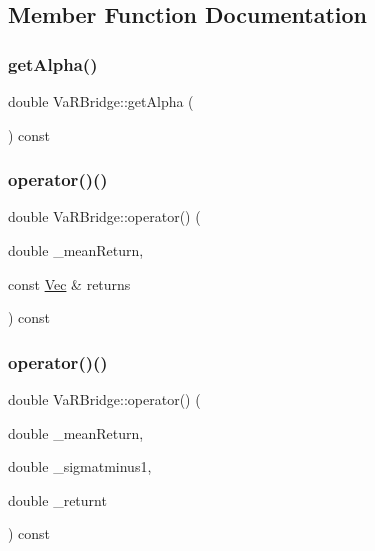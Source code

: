 \subsection{Member Function Documentation}
\hypertarget{classVaRBridge_ab7bea293648bfa62762a3c61f162107e}{}\label{classVaRBridge_ab7bea293648bfa62762a3c61f162107e} 
\subsubsection{\texorpdfstring{get\+Alpha()}{getAlpha()}}
{\footnotesize\ttfamily double Va\+R\+Bridge\+::get\+Alpha (\begin{DoxyParamCaption}{ }\end{DoxyParamCaption}) const\hspace{0.3cm}{\ttfamily [inline]}}

\hypertarget{classVaRBridge_a64a2c30c69d03b4f75beb3087d3f1ea2}{}\label{classVaRBridge_a64a2c30c69d03b4f75beb3087d3f1ea2} 
\subsubsection{\texorpdfstring{operator()()}{operator()()}\hspace{0.1cm}{\footnotesize\ttfamily [1/3]}}
{\footnotesize\ttfamily double Va\+R\+Bridge\+::operator() (\begin{DoxyParamCaption}\item[{double}]{\+\_\+mean\+Return,  }\item[{const \hyperlink{compute__returns__eigen_8h_a1eb6a9306ef406d7975f3cbf2e247777}{Vec} \&}]{returns }\end{DoxyParamCaption}) const\hspace{0.3cm}{\ttfamily [inline]}}

\hypertarget{classVaRBridge_ade75c664cc693524898fee6d66ae36b0}{}\label{classVaRBridge_ade75c664cc693524898fee6d66ae36b0} 
\subsubsection{\texorpdfstring{operator()()}{operator()()}\hspace{0.1cm}{\footnotesize\ttfamily [2/3]}}
{\footnotesize\ttfamily double Va\+R\+Bridge\+::operator() (\begin{DoxyParamCaption}\item[{double}]{\+\_\+mean\+Return,  }\item[{double}]{\+\_\+sigmatminus1,  }\item[{double}]{\+\_\+returnt }\end{DoxyParamCaption}) const\hspace{0.3cm}{\ttfamily [inline]}}

